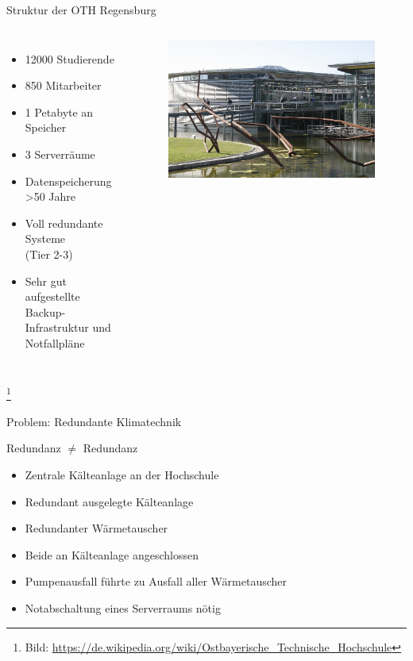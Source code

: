 \documentclass[10pt]{beamer}
\newcommand\blfootnote[1]{%
	\begingroup
	\renewcommand\thefootnote{}\footnote{#1}%
	\addtocounter{footnote}{-1}%
	\endgroup
}
\begin{document}
%
%
\begin{frame}[fragile]{Struktur der OTH Regensburg}
\begin{columns}[T,c,onlytextwidth]
	\begin{itemize}
		\item 12000 Studierende
		\item 850 Mitarbeiter
		\item 1 Petabyte an Speicher
		\item 3 Serverräume
		\item Datenspeicherung \textgreater 50 Jahre
		\item Voll redundante Systeme \\(Tier 2-3)
		\item Sehr gut aufgestellte Backup-Infrastruktur und Notfallpläne
	\end{itemize}
	\begin{figure}
		\includegraphics[width=1\textwidth]{images/oth}
	\end{figure}
\end{columns}

\blfootnote{Bild: \href{https://de.wikipedia.org/wiki/Datei:OTH_Regensburg_01.jpg}{https://de.wikipedia.org/wiki/Ostbayerische\_Technische\_Hochschule}}
\end{frame}

%
%
\begin{frame}[fragile]{Problem: Redundante Klimatechnik}
\begin{alertblock}{Redundanz $\neq$ Redundanz}
\end{alertblock}
\begin{itemize}
	\item Zentrale Kälteanlage an der Hochschule
	\item Redundant ausgelegte Kälteanlage
	\item Redundanter Wärmetauscher
	\item Beide an Kälteanlage angeschlossen
	\item Pumpenausfall führte zu Ausfall aller Wärmetauscher
	\item Notabschaltung eines Serverraums nötig
\end{itemize}
\end{frame}
\end{document}
